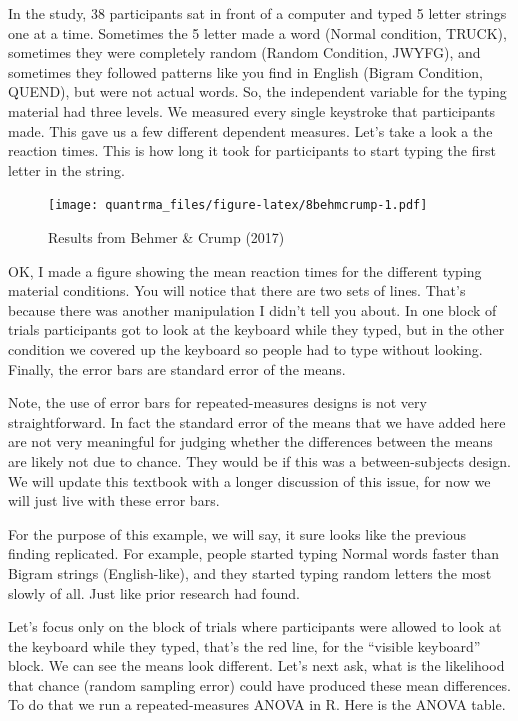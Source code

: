 \documentclass[
]{book}
\begin{document}
In the study, 38 participants sat in front of a computer and typed 5 letter strings one at a time. Sometimes the 5 letter made a word (Normal condition, TRUCK), sometimes they were completely random (Random Condition, JWYFG), and sometimes they followed patterns like you find in English (Bigram Condition, QUEND), but were not actual words. So, the independent variable for the typing material had three levels. We measured every single keystroke that participants made. This gave us a few different dependent measures. Let's take a look a the reaction times. This is how long it took for participants to start typing the first letter in the string.

\begin{figure}
\centering
\texttt{[image: quantrma\_files/figure-latex/8behmcrump-1.pdf]}
\caption{\label{fig:8behmcrump}Results from Behmer \& Crump (2017)}
\end{figure}

OK, I made a figure showing the mean reaction times for the different typing material conditions. You will notice that there are two sets of lines. That's because there was another manipulation I didn't tell you about. In one block of trials participants got to look at the keyboard while they typed, but in the other condition we covered up the keyboard so people had to type without looking. Finally, the error bars are standard error of the means.

\begin{marginnote}

Note, the use of error bars for repeated-measures designs is not very straightforward. In fact the standard error of the means that we have added here are not very meaningful for judging whether the differences between the means are likely not due to chance. They would be if this was a between-subjects design. We will update this textbook with a longer discussion of this issue, for now we will just live with these error bars.

\end{marginnote}

For the purpose of this example, we will say, it sure looks like the previous finding replicated. For example, people started typing Normal words faster than Bigram strings (English-like), and they started typing random letters the most slowly of all. Just like prior research had found.

Let's focus only on the block of trials where participants were allowed to look at the keyboard while they typed, that's the red line, for the ``visible keyboard'' block. We can see the means look different. Let's next ask, what is the likelihood that chance (random sampling error) could have produced these mean differences. To do that we run a repeated-measures ANOVA in R. Here is the ANOVA table.
\end{document}
